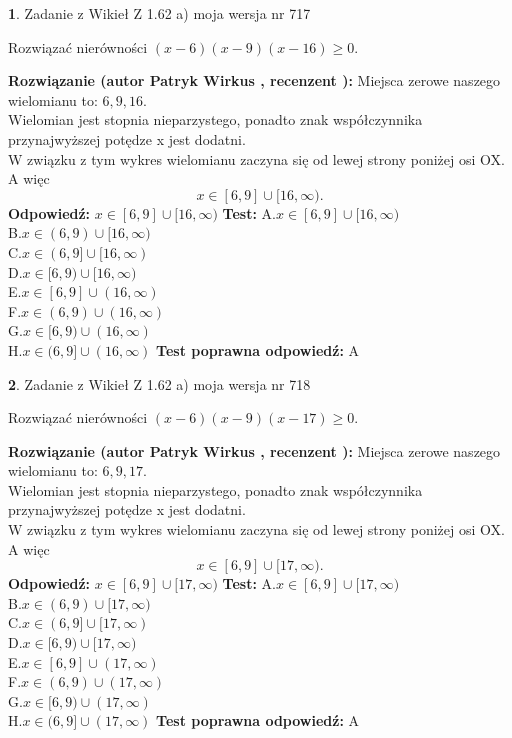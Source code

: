 \documentclass[12pt, a4paper]{article}
\theoremstyle{definition} %
\newtheorem{zad}{}
\newcommand{\zadStart}[1]{\begin{zad}#1\newline}
\newcommand{\zadStop}{\end{zad}}
\newcommand{\rozwStart}[2]{\noindent \textbf{Rozwiązanie (autor #1 , recenzent #2): }\newline}
\newcommand{\rozwStop}{\newline}
\newcommand{\odpStart}{\noindent \textbf{Odpowiedź:}\newline}
\newcommand{\odpStop}{\newline}
\newcommand{\testStart}{\noindent \textbf{Test:}\newline}
\newcommand{\testStop}{\newline}
\newcommand{\kluczStart}{\noindent \textbf{Test poprawna odpowiedź:}\newline}
\newcommand{\kluczStop}{\newline}
\begin{document}
\zadStart{Zadanie z Wikieł Z 1.62 a) moja wersja nr 717}

Rozwiązać nierówności $(x-6)(x-9)(x-16)\ge0$.
\zadStop
\rozwStart{Patryk Wirkus}{}
Miejsca zerowe naszego wielomianu to: $6, 9, 16$.\\
Wielomian jest stopnia nieparzystego, ponadto znak współczynnika przy\linebreak najwyższej potędze x jest dodatni.\\ W związku z tym wykres wielomianu zaczyna się od lewej strony poniżej osi OX. A więc $$x \in [6,9] \cup [16,\infty).$$
\rozwStop
\odpStart
$x \in [6,9] \cup [16,\infty)$
\odpStop
\testStart
A.$x \in [6,9] \cup [16,\infty)$\\
B.$x \in (6,9) \cup [16,\infty)$\\
C.$x \in (6,9] \cup [16,\infty)$\\
D.$x \in [6,9) \cup [16,\infty)$\\
E.$x \in [6,9] \cup (16,\infty)$\\
F.$x \in (6,9) \cup (16,\infty)$\\
G.$x \in [6,9) \cup (16,\infty)$\\
H.$x \in (6,9] \cup (16,\infty)$
\testStop
\kluczStart
A
\kluczStop



\zadStart{Zadanie z Wikieł Z 1.62 a) moja wersja nr 718}

Rozwiązać nierówności $(x-6)(x-9)(x-17)\ge0$.
\zadStop
\rozwStart{Patryk Wirkus}{}
Miejsca zerowe naszego wielomianu to: $6, 9, 17$.\\
Wielomian jest stopnia nieparzystego, ponadto znak współczynnika przy\linebreak najwyższej potędze x jest dodatni.\\ W związku z tym wykres wielomianu zaczyna się od lewej strony poniżej osi OX. A więc $$x \in [6,9] \cup [17,\infty).$$
\rozwStop
\odpStart
$x \in [6,9] \cup [17,\infty)$
\odpStop
\testStart
A.$x \in [6,9] \cup [17,\infty)$\\
B.$x \in (6,9) \cup [17,\infty)$\\
C.$x \in (6,9] \cup [17,\infty)$\\
D.$x \in [6,9) \cup [17,\infty)$\\
E.$x \in [6,9] \cup (17,\infty)$\\
F.$x \in (6,9) \cup (17,\infty)$\\
G.$x \in [6,9) \cup (17,\infty)$\\
H.$x \in (6,9] \cup (17,\infty)$
\testStop
\kluczStart
A
\kluczStop
\end{document}
